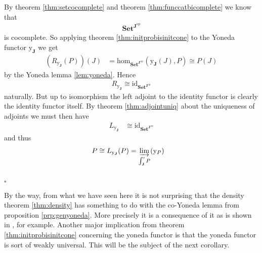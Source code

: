 \begin{prf}
By theorem \ref{thm:setcocomplete} and theorem \ref{thm:funccatbicomplete} we know that
\begin{align*}
  \mathbf{Set}^{\mathbf{J}^{\textrm{op}}}
\end{align*}
is cocomplete. So applying theorem \ref{thm:initprobisinitcone} to the Yoneda functor $\mathrm{y}_{\mathbf{J}}$ we get
\begin{align*}
  \left(
    R_{\mathrm{y}_{\mathbf{J}}}(P)
  \right)
  (J)
  &=
  \mathrm{hom}_{\mathbf{Set}^{\mathbf{J}^{\textrm{op}}}}
  \left(
    \mathrm{y}_{\mathbf{J}}(J),
    P
  \right)
  \cong
  P(J)
\end{align*}
by the Yoneda lemma \ref{lem:yoneda}. Hence
\begin{align*}
  R_{\mathrm{y}_{\mathbf{J}}}
  \cong
  \mathrm{id}_{\mathbf{Set}^{\mathbf{J}^{\textrm{op}}}}
\end{align*}
naturally. But up to isomorphism the left adjoint to the identity functor is clearly the identity functor itself. By theorem \ref{thm:adjointuniq} about the uniqueness of adjoints we must then have
\begin{align*}
  L_{\mathrm{y}_{\mathbf{J}}}
  &\cong
  \mathrm{id}_{\mathbf{Set}^{\mathbf{J}^{\textrm{op}}}}
\end{align*}
and thus
\begin{align*}
  P
  &\cong
  L_{\mathrm{y}_{\mathbf{J}}}(P)
  =
  \varinjlim_{\int_{\mathbf{J}}^{\prime}P}(\mathrm{y}_{P})
\end{align*}
\\
\phantom{proven}
\hfill
$\square$
\end{prf}
By the way, from what we have seen here it is not surprising that the density theorem \ref{thm:density} has something to do with the co-Yoneda lemma from proposition \ref{prp:genyoneda}. More precisely it is a consequence of it as is shown in \cite{52fbba46}, for example. Another major implication from theorem \ref{thm:initprobisinitcone} concerning the yoneda functor is that the yoneda functor is sort of weakly universal. This will be the subject of the next corollary.
\\
